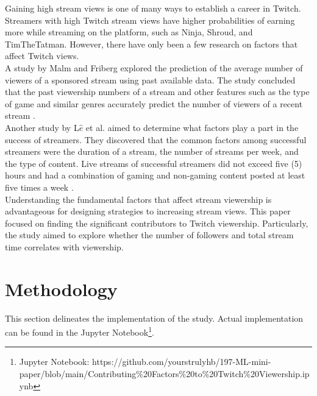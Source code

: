 \documentclass[runningheads]{llncs}
\begin{document}
Gaining high stream views is one of many ways to establish a career in Twitch. Streamers with high Twitch stream views have higher probabilities of earning more while streaming on the platform, such as Ninja, Shroud, and TimTheTatman. However, there have only been a few research on factors that affect Twitch views. \\

A study by Malm and Friberg explored the prediction of the average number of viewers of a sponsored stream using past available data. The study concluded that the past viewership numbers of a stream and other features such as the type of game and similar genres accurately predict the number of viewers of a recent stream \cite{malm2022viewership}.\\ 

Another study by L$\hat{e}$ et al. aimed to determine what factors play a part in the success of streamers. They discovered that the common factors among successful streamers were the duration of a stream, the number of streams per week, and the type of content. Live streams of successful streamers did not exceed five (5) hours and had a combination of gaming and non-gaming content posted at least five times a week \cite{le2021study}.  \\


Understanding the fundamental factors that affect stream viewership is advantageous for designing strategies to increasing stream views. This paper focused on finding the significant contributors to Twitch viewership. Particularly, the study aimed to explore whether the number of followers and total stream time correlates with viewership.

\section{Methodology}
This section delineates the implementation of the study. Actual implementation can be found in the Jupyter Notebook\footnote{Jupyter Notebook: https://github.com/yourstrulyhb/197-ML-mini-paper/blob/main/Contributing\%20Factors\%20to\%20Twitch\%20Viewership.ipynb}.
\end{document}
